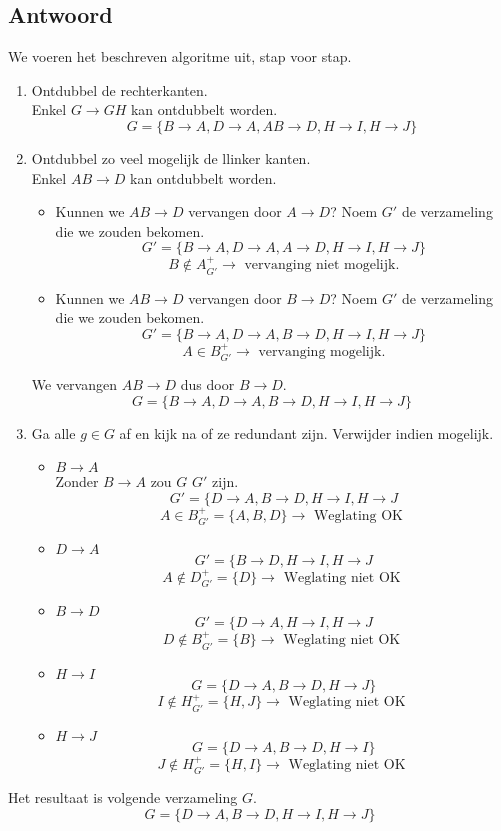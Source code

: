 \documentclass[normaalvormen.tex]{subfiles}
\begin{document}
\subsection*{Antwoord}
We voeren het beschreven algoritme uit, stap voor stap.
\begin{enumerate}
\item Ontdubbel de rechterkanten.\\
Enkel $G \rightarrow GH$ kan ontdubbelt worden.
\[
G = \{ B\rightarrow A, D\rightarrow A, AB \rightarrow D, H\rightarrow I, H\rightarrow J\}
\]
\item Ontdubbel zo veel mogelijk de llinker kanten.\\
Enkel $AB \rightarrow D$ kan ontdubbelt worden.
\begin{itemize}
\item Kunnen we $AB\rightarrow D$ vervangen door $A\rightarrow D$?
Noem $G'$ de verzameling die we zouden bekomen.
\[
G' = \{ B\rightarrow A, D\rightarrow A, A \rightarrow D, H\rightarrow I, H\rightarrow J\}
\]
\[
B \not\in A_{G'}^{+} \rightarrow \text{ vervanging niet mogelijk.}
\]
\item Kunnen we $AB\rightarrow D$ vervangen door $B\rightarrow D$?
Noem $G'$ de verzameling die we zouden bekomen.
\[
G' = \{ B\rightarrow A, D\rightarrow A, B \rightarrow D, H\rightarrow I, H\rightarrow J\}
\]
\[
A \in B_{G'}^{+} \rightarrow \text{ vervanging mogelijk.}
\]
\end{itemize}
We vervangen $AB\rightarrow D$ dus door $B\rightarrow D$.
\[
G = \{ B\rightarrow A, D\rightarrow A, B \rightarrow D, H\rightarrow I, H\rightarrow J\}
\]

\item Ga alle $g\in G$ af en kijk na of ze redundant zijn. Verwijder indien mogelijk.
\begin{itemize}
\item $B\rightarrow A$\\
Zonder $B\rightarrow A$ zou $G$ $G'$ zijn.
\[
G' = \{D\rightarrow A, B\rightarrow D, H\rightarrow I, H\rightarrow J
\] 
\[
A \in B_{G'}^{+} = \{A,B,D\} \rightarrow \text{ Weglating OK }
\]
\item $D\rightarrow A$
\[
G' = \{B\rightarrow D, H\rightarrow I, H\rightarrow J
\]
\[
A \not\in D_{G'}^{+} = \{D\} \rightarrow \text{ Weglating niet OK }
\]
\item $B\rightarrow D$
\[
G' = \{D\rightarrow A, H\rightarrow I, H\rightarrow J
\]
\[
D \not\in B_{G'}^{+} = \{B\} \rightarrow \text{ Weglating niet OK }
\]
\item $H\rightarrow I$
\[
G = \{D\rightarrow A, B \rightarrow D, H\rightarrow J\}
\]
\[
I \not\in H_{G'}^{+} = \{H,J\} \rightarrow \text{ Weglating niet OK }
\]
\item $H\rightarrow J$
\[
G = \{D\rightarrow A, B \rightarrow D, H\rightarrow I\}
\]
\[
J \not\in H_{G'}^{+} = \{H,I\} \rightarrow \text{ Weglating niet OK }
\]
\end{itemize}
\end{enumerate}
Het resultaat is volgende verzameling $G$.
\[
G = \{D\rightarrow A, B \rightarrow D, H\rightarrow I, H\rightarrow J\}
\]
\end{document}
